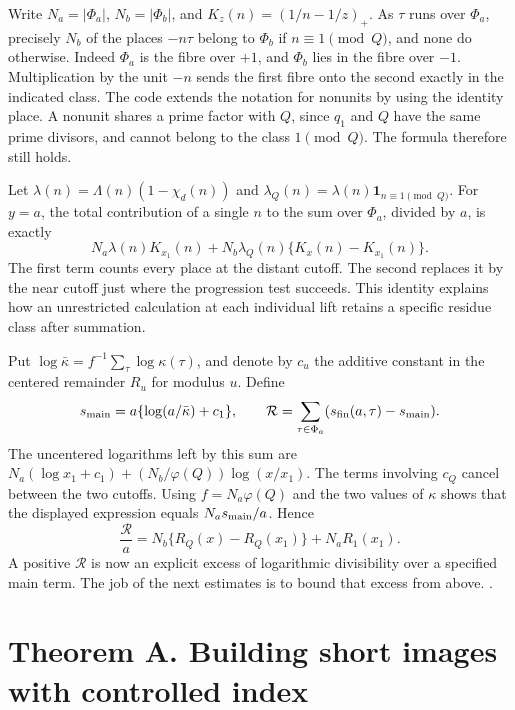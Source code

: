 Write \(N_a=|\Phi_a|\), \(N_b=|\Phi_b|\), and \(K_z(n)=(1/n-1/z)_+\). As \(\tau\) runs over \(\Phi_a\), precisely \(N_b\) of the places \(-n\tau\) belong to \(\Phi_b\) if \(n\equiv1\pmod Q\), and none do otherwise. Indeed \(\Phi_a\) is the fibre over \(+1\), and \(\Phi_b\) lies in the fibre over \(-1\). Multiplication by the unit \(-n\) sends the first fibre onto the second exactly in the indicated class. The code extends the notation for nonunits by using the identity place. A nonunit shares a prime factor with \(Q\), since \(q_1\) and \(Q\) have the same prime divisors, and cannot belong to the class \(1\pmod Q\). The formula therefore still holds.

Let \(\lambda(n)=\Lambda(n)(1-\chi_d(n))\) and \(\lambda_Q(n)=\lambda(n)\mathbf1_{n\equiv1\pmod Q}\). For \(y=a\), the total contribution of a single \(n\) to the sum over \(\Phi_a\), divided by \(a\), is exactly
\[
 N_a\lambda(n)K_{x_1}(n)+N_b\lambda_Q(n)\{K_x(n)-K_{x_1}(n)\}.
\]
The first term counts every place at the distant cutoff. The second replaces it by the near cutoff just where the progression test succeeds. This identity explains how an unrestricted calculation at each individual lift retains a specific residue class after summation.

Put \(\log\bar\kappa=f^{-1}\sum_\tau\log\kappa(\tau)\), and denote by \(c_u\) the additive constant in the centered remainder \(R_u\) for modulus \(u\). Define
\[
 s_{\rm main}=a\{\log(a/\bar\kappa)+c_1\},\qquad
 \mathcal R=\sum_{\tau\in\Phi_a}(s_{\rm fin}(a,\tau)-s_{\rm main}).
\]
The uncentered logarithms left by this sum are
\(N_a(\log x_1+c_1)+(N_b/\varphi(Q))\log(x/x_1)\). The terms involving \(c_Q\) cancel between the two cutoffs. Using \(f=N_a\varphi(Q)\) and the two values of \(\kappa\) shows that the displayed expression equals \(N_a s_{\rm main}/a\). Hence
\begin{equation}\label{eq:bridge-remainder}
 \frac{\mathcal R}{a}=N_b\{R_Q(x)-R_Q(x_1)\}+N_a R_1(x_1).
\end{equation}
A positive \(\mathcal R\) is now an explicit excess of logarithmic divisibility over a specified main term. The job of the next estimates is to bound that excess from above. .

\section{Theorem A. Building short images with controlled index}\label{sec:bridge-short}


